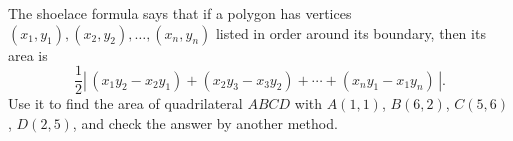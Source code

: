 The shoelace formula says that if a polygon has vertices $(x_1,y_1),(x_2,y_2),\dots,(x_n,y_n)$ listed in order around its boundary, then its area is
\[
\dfrac{1}{2}\left|\,(x_1y_2-x_2y_1)+(x_2y_3-x_3y_2)+\cdots+(x_ny_1-x_1y_n)\,\right| .
\]
Use it to find the area of quadrilateral $ABCD$ with $A(1,1)$, $B(6,2)$, $C(5,6)$, $D(2,5)$, and check the answer by another method.
